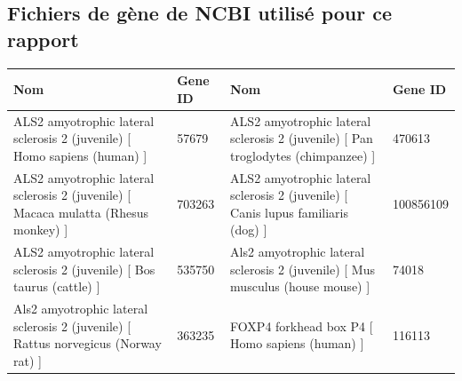 \documentclass[10.9pt]{article} %
\begin{document}
\subsection{Fichiers de gène de NCBI utilisé pour ce rapport}\label{27}

 \footnotesize{
\begin{longtable}{|p{4.5cm}|p{3.5cm}|p{4.5cm}|p{3.5cm}|}
\hline
 Nom & Gene ID & Nom & Gene ID\\
 \hline \endhead
 ALS2 amyotrophic lateral sclerosis 2 (juvenile) [ Homo sapiens (human) ]  & 57679 & ALS2 amyotrophic lateral sclerosis 2 (juvenile) [ Pan troglodytes (chimpanzee) ]  & 470613 \\
 \hline
 ALS2 amyotrophic lateral sclerosis 2 (juvenile) [ Macaca mulatta (Rhesus monkey) ] & 703263 & ALS2 amyotrophic lateral sclerosis 2 (juvenile) [ Canis lupus familiaris (dog) ] & 100856109 \\
 \hline
  ALS2 amyotrophic lateral sclerosis 2 (juvenile) [ Bos taurus (cattle) ]  & 535750 & Als2 amyotrophic lateral sclerosis 2 (juvenile) [ Mus musculus (house mouse) ] & 74018 \\
 \hline
   Als2 amyotrophic lateral sclerosis 2 (juvenile) [ Rattus norvegicus (Norway rat) ]  & 363235 & FOXP4 forkhead box P4 [ Homo sapiens (human) ] & 116113 \\
 \hline
 \end{longtable}
 }
\endgroup
\end{document}
